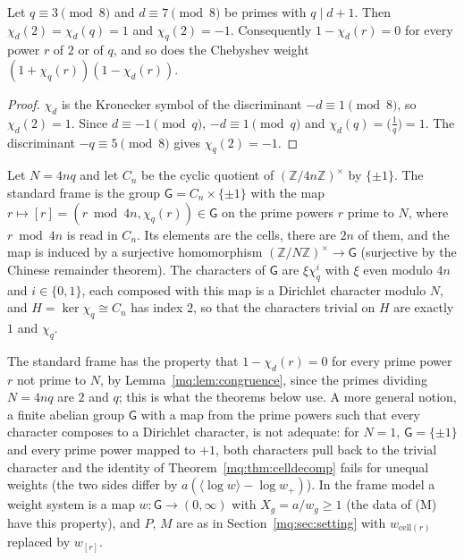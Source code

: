 \begin{lemma}\label{mq:lem:congruence}
Let $q\equiv3\pmod8$ and $d\equiv7\pmod8$ be primes with $q\mid d+1$. Then $\chi_d(2)=\chi_d(q)=1$ and $\chi_q(2)=-1$. Consequently $1-\chi_d(r)=0$ for every power $r$ of $2$ or of $q$, and so does the Chebyshev weight $(1+\chi_q(r))(1-\chi_d(r))$.
\end{lemma}

\begin{proof}
$\chi_d$ is the Kronecker symbol of the discriminant $-d\equiv1\pmod8$, so $\chi_d(2)=1$. Since $d\equiv-1\pmod q$, $-d\equiv1\pmod q$ and $\chi_d(q)=\big(\frac1q\big)=1$. The discriminant $-q\equiv5\pmod8$ gives $\chi_q(2)=-1$.
\end{proof}

\begin{definition}\label{mq:def:frame}
Let $N=4nq$ and let $C_n$ be the cyclic quotient of $(\mathbb Z/4n\mathbb Z)^\times$ by $\{\pm1\}$. The standard frame is the group $\mathsf G=C_n\times\{\pm1\}$ with the map $r\mapsto[r]=(r\bmod4n,\chi_q(r))\in\mathsf G$ on the prime powers $r$ prime to $N$, where $r\bmod4n$ is read in $C_n$. Its elements are the cells, there are $2n$ of them, and the map is induced by a surjective homomorphism $(\mathbb Z/N\mathbb Z)^\times\to\mathsf G$ (surjective by the Chinese remainder theorem). The characters of $\mathsf G$ are $\xi\chi_q^i$ with $\xi$ even modulo $4n$ and $i\in\{0,1\}$, each composed with this map is a Dirichlet character modulo $N$, and $H=\ker\chi_q\cong C_n$ has index $2$, so that the characters trivial on $H$ are exactly $1$ and $\chi_q$.
\end{definition}

The standard frame has the property that $1-\chi_d(r)=0$ for every prime power $r$ not prime to $N$, by Lemma~\ref{mq:lem:congruence}, since the primes dividing $N=4nq$ are $2$ and $q$; this is what the theorems below use. A more general notion, a finite abelian group $\mathsf G$ with a map from the prime powers such that every character composes to a Dirichlet character, is not adequate: for $N=1$, $\mathsf G=\{\pm1\}$ and every prime power mapped to $+1$, both characters pull back to the trivial character and the identity of Theorem~\ref{mq:thm:celldecomp} fails for unequal weights (the two sides differ by $a(\langle\log w\rangle-\log w_+)$). In the frame model a weight system is a map $w:\mathsf G\to(0,\infty)$ with $X_g=a/w_g\ge1$ (the data of (M) have this property), and $P$, $M$ are as in Section~\ref{mq:sec:setting} with $w_{\mathrm{cell}(r)}$ replaced by $w_{[r]}$.

